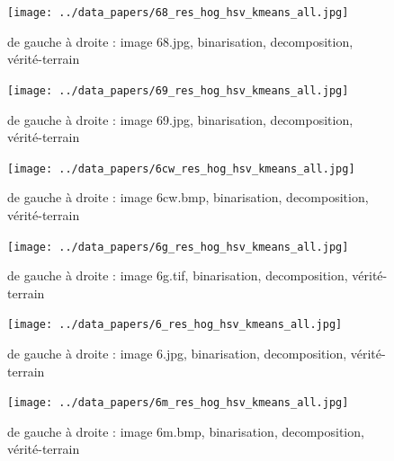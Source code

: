 \documentclass{book}
\begin{document}
\begin{figure}[H]
\begin{center}
\texttt{[image: ../data\_papers/68\_res\_hog\_hsv\_kmeans\_all.jpg]}
\end{center}
\caption{de gauche à droite : image 68.jpg, binarisation, decomposition, vérité-terrain}
\label{68}
\end{figure}
\clearpage


\begin{figure}[H]
\begin{center}
\texttt{[image: ../data\_papers/69\_res\_hog\_hsv\_kmeans\_all.jpg]}
\end{center}
\caption{de gauche à droite : image 69.jpg, binarisation, decomposition, vérité-terrain}
\label{69}
\end{figure}
\clearpage


\begin{figure}[H]
\begin{center}
\texttt{[image: ../data\_papers/6cw\_res\_hog\_hsv\_kmeans\_all.jpg]}
\end{center}
\caption{de gauche à droite : image 6cw.bmp, binarisation, decomposition, vérité-terrain}
\label{6cw}
\end{figure}
\clearpage


\begin{figure}[H]
\begin{center}
\texttt{[image: ../data\_papers/6g\_res\_hog\_hsv\_kmeans\_all.jpg]}
\end{center}
\caption{de gauche à droite : image 6g.tif, binarisation, decomposition, vérité-terrain}
\label{6g}
\end{figure}
\clearpage


\begin{figure}[H]
\begin{center}
\texttt{[image: ../data\_papers/6\_res\_hog\_hsv\_kmeans\_all.jpg]}
\end{center}
\caption{de gauche à droite : image 6.jpg, binarisation, decomposition, vérité-terrain}
\label{6}
\end{figure}
\clearpage


\begin{figure}[H]
\begin{center}
\texttt{[image: ../data\_papers/6m\_res\_hog\_hsv\_kmeans\_all.jpg]}
\end{center}
\caption{de gauche à droite : image 6m.bmp, binarisation, decomposition, vérité-terrain}
\label{6m}
\end{figure}
\clearpage
\end{document}
